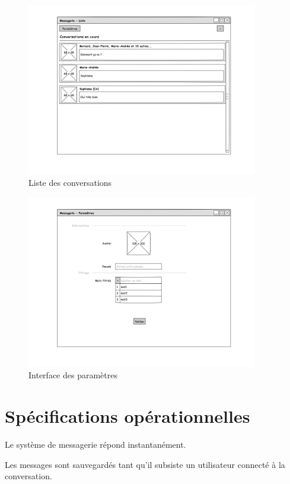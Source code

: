 \documentclass[11pt,dvipsnames,svgnames]{report}
\begin{document}
\begin{figure}[H]
\caption{Liste des conversations}
\centerline{\includegraphics[width=0.9\textwidth]{maquette/maquette2.png}}
\end{figure}

\begin{figure}[H]
\caption{Interface des paramètres}
\centerline{\includegraphics[width=0.9\textwidth]{maquette/maquette3.png}}
\end{figure}


\section{Spécifications opérationnelles}

Le système de messagerie répond instantanément.

Les messages sont sauvegardés tant qu'il subsiste un utilisateur connecté à la conversation.
\end{document}
